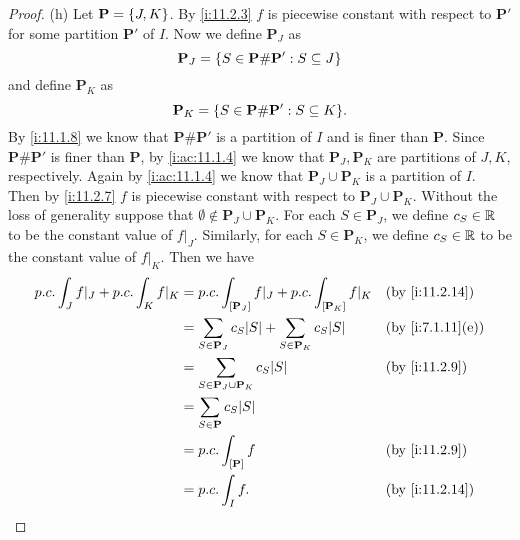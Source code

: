 \begin{proof}{(h)}
  Let \(\mathbf{P} = \left\lbrace J, K\right\rbrace\).
  By \cref{i:11.2.3} \(f\) is piecewise constant with respect to \(\mathbf{P}'\) for some partition \(\mathbf{P}'\) of \(I\).
  Now we define \(\mathbf{P}_J\) as
  \[
    \mathbf{P}_J = \left\lbrace S \in \mathbf{P} \# \mathbf{P}' : S \subseteq J\right\rbrace
  \]
  and define \(\mathbf{P}_K\) as
  \[
    \mathbf{P}_K = \set{S \in \mathbf{P} \# \mathbf{P}' : S \subseteq K}.
  \]
  By \cref{i:11.1.8} we know that \(\mathbf{P} \# \mathbf{P}'\) is a partition of \(I\) and is finer than \(\mathbf{P}\).
  Since \(\mathbf{P} \# \mathbf{P}'\) is finer than \(\mathbf{P}\), by \cref{i:ac:11.1.4} we know that \(\mathbf{P}_J, \mathbf{P}_K\) are partitions of \(J, K\), respectively.
  Again by \cref{i:ac:11.1.4} we know that \(\mathbf{P}_J \cup \mathbf{P}_K\) is a partition of \(I\).
  Then by \cref{i:11.2.7} \(f\) is piecewise constant with respect to \(\mathbf{P}_J \cup \mathbf{P}_K\).
  Without the loss of generality suppose that \(\emptyset \notin \mathbf{P}_J \cup \mathbf{P}_K\).
  For each \(S \in \mathbf{P}_J\), we define \(c_S \in \mathbb{R}\) to be the constant value of \(f|_J\).
  Similarly, for each \(S \in \mathbf{P}_K\), we define \(c_S \in \mathbb{R}\) to be the constant value of \(f|_K\).
  Then we have
  \begin{align*}
    p.c. \int_J f|_J + p.c. \int_K f|_K & = p.c. \int_{[\mathbf{P}_J]} f|_J + p.c. \int_{[\mathbf{P}_K]} f|_K             &  & \by{i:11.2.14}   \\
                                        & = \sum_{S \in \mathbf{P}_J} c_S \abs{S} + \sum_{S \in \mathbf{P}_K} c_S \abs{S} &  & \by{i:7.1.11}[e] \\
                                        & = \sum_{S \in \mathbf{P}_J \cup \mathbf{P}_K} c_S \abs{S}                       &  & \by{i:11.2.9}    \\
                                        & = \sum_{S \in \mathbf{P}} c_S \abs{S}                                                                 \\
                                        & = p.c. \int_{[\mathbf{P}]} f                                                    &  & \by{i:11.2.9}    \\
                                        & = p.c. \int_I f.                                                                &  & \by{i:11.2.14}
  \end{align*}
\end{proof}

\exercisesection

